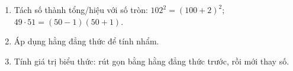 \begin{enumerate}
\item Tách số thành tổng/hiệu với số tròn: $102^2=(100+2)^2$; \ $49\cdot 51=(50-1)(50+1)$.
\item Áp dụng hằng đẳng thức để tính nhẩm.
\item Tính giá trị biểu thức: rút gọn bằng hằng đẳng thức trước, rồi mới thay số.
\end{enumerate}

